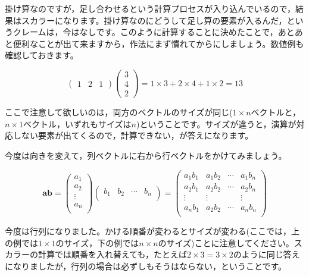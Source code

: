 \documentclass{ltjsbook}
\begin{document}
掛け算なのですが，足し合わせるという計算プロセスが入り込んでいるので，結果はスカラーになります。掛け算なのにどうして足し算の要素が入るんだ，というクレームは，今はなしです。このように計算することに決めたことで，あとあと便利なことが出て来ますから，作法にまず慣れてからにしましょう。数値例も確認しておきます。

\begin{equation*}
	\begin{pmatrix}
		1 & 2 & 1
	\end{pmatrix}
	\begin{pmatrix}
		3 \\4\\2
	\end{pmatrix}
	=1\times 3 + 2 \times 4 + 1 \times 2 = 13
\end{equation*}

ここで注意して欲しいのは，両方のベクトルのサイズが同じ($1\times n$ベクトルと，$n \times 1$ベクトル，いずれもサイズは$n$)ということです。サイズが違うと，演算が対応しない要素が出てくるので，計算できない，が答えになります。

今度は向きを変えて，列ベクトルに右から行ベクトルをかけてみましょう。

\begin{equation*}
	\bm{a} \bm{b} =
	\begin{pmatrix}
		a_1    \\
		a_2    \\
		\vdots \\
		a_n    \\
	\end{pmatrix}
	\begin{pmatrix}
		b_1 & b_2 & \cdots & b_n \\
	\end{pmatrix}
	=
	\begin{pmatrix}
		a_1 b_1 & a_1 b_2 & \cdots & a_1 b_n \\
		a_2 b_1 & a_2 b_2 & \cdots & a_2 b_n \\
		\vdots  & \vdots  &        & \vdots  \\
		a_n b_1 & a_2 b_2 & \cdots & a_n b_n \\
	\end{pmatrix}
\end{equation*}


今度は行列になりました。かける順番が変わるとサイズが変わる(ここでは，上の例では$1\times 1$のサイズ，下の例では$n \times n$のサイズ)ことに注意してください。スカラーの計算では順番を入れ替えても，たとえば$2 \times 3=3\times 2$のように同じ答えになりましたが，行列の場合は必ずしもそうはならない，ということです。
\end{document}
